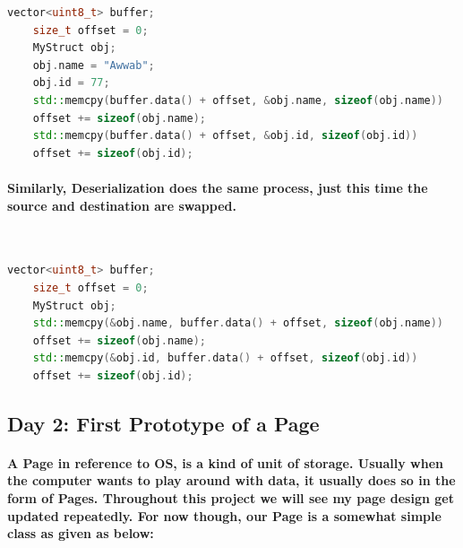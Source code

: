 \documentclass{article}
\begin{document}
\begin{lstlisting}[language=C++]
    vector<uint8_t> buffer;
    size_t offset = 0;
    MyStruct obj;
    obj.name = "Awwab";
    obj.id = 77;
    std::memcpy(buffer.data() + offset, &obj.name, sizeof(obj.name))
    offset += sizeof(obj.name);
    std::memcpy(buffer.data() + offset, &obj.id, sizeof(obj.id))
    offset += sizeof(obj.id);
\end{lstlisting}

\paragraph{
    Similarly, Deserialization does the same process, just this time the source and destination are swapped.
}  \mbox{} \\

\begin{lstlisting}[language=C++]
    vector<uint8_t> buffer;
    size_t offset = 0;
    MyStruct obj;
    std::memcpy(&obj.name, buffer.data() + offset, sizeof(obj.name))
    offset += sizeof(obj.name);
    std::memcpy(&obj.id, buffer.data() + offset, sizeof(obj.id))
    offset += sizeof(obj.id);
\end{lstlisting}

\newpage
\subsection{Day 2: First Prototype of a Page}

\paragraph{
    A Page in reference to OS, is a kind of unit of storage.
    Usually when the computer wants to play around with data, it usually does so in the form of Pages.
    \newline Throughout this project we will see my page design get updated repeatedly.
    For now though, our Page is a somewhat simple class as given as below:
} \mbox{} \\
\end{document}
